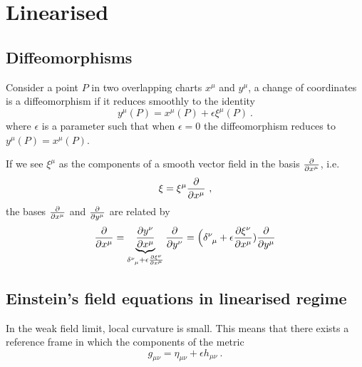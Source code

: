 \chapter{Linearised}

\section{Diffeomorphisms}

    Consider a point $P$ in two overlapping charts $x^\mu$ and $y^\mu$, a change of coordinates is a diffeomorphism if it reduces smoothly to the identity 
    \begin{equation}\label{diffeo}
        y^\mu (P) = x^\mu (P) + \epsilon \xi^\mu (P) ~.
    \end{equation}
    where $\epsilon$ is a parameter such that when $\epsilon = 0$ the diffeomorphism reduces to $y^\mu (P) = x^\mu (P)$. 

    If we see $\xi^\mu$ as the components of a smooth vector field in the basis $\frac{\partial}{\partial x^\mu}$, i.e. 
    \begin{equation*}
        \xi = \xi^\mu \frac{\partial}{\partial x^\mu} ~,
    \end{equation*}
    the bases $\frac{\partial}{\partial x^\mu}$ and $\frac{\partial}{\partial y^\mu}$ are related by 
    \begin{equation*}
        \pdv{}{x^\mu} = \underbrace{\pdv{y^\nu}{x^\mu}}_{\delta^\nu_{\phantom \nu \mu} + \epsilon \pdv{\xi^\nu}{x^\mu}} \pdv{}{y^\nu} = \Big (\delta^\nu_{\phantom \nu \mu} + \epsilon \pdv{\xi^\nu}{x^\mu}) \pdv{}{y^\mu}
    \end{equation*}


\section{Einstein's field equations in linearised regime}

    In the weak field limit, local curvature is small. This means that there exists a reference frame in which the components of the metric 
    \begin{equation*}
        g_{\mu\nu} = \eta_{\mu\nu} + \epsilon h_{\mu\nu} ~.
    \end{equation*}

